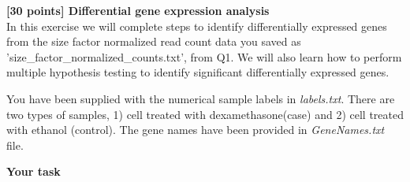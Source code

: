 {\bf [30 points] Differential gene expression analysis}\\

In this exercise we will complete steps to identify differentially expressed genes from the size factor normalized read count data you saved as 'size\_factor\_normalized\_counts.txt', from Q1. We will also learn how to perform multiple hypothesis testing to identify significant differentially expressed genes.

You have been supplied with the numerical sample labels in \textit{labels.txt}. There are two types of samples, 1) cell treated with dexamethasone(case) and 2) cell treated with ethanol (control). The gene names have been provided in \textit{GeneNames.txt} file.

\vspace{20pt}


\vspace{20pt}

\textbf{Your task}

\vspace{20pt}

